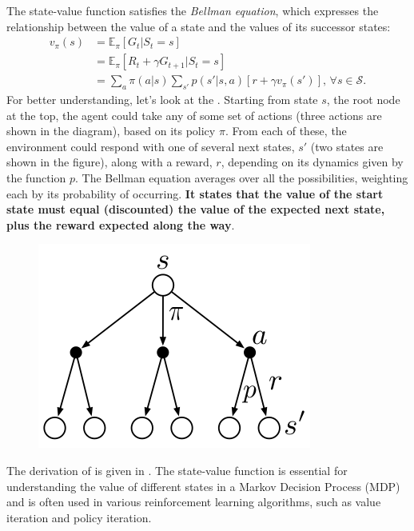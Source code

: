 The state-value function satisfies the \textit{Bellman equation}, which expresses the relationship between the value of a state and the values of its successor states:
\begin{align}
	v_\pi(s) &= \mathbb{E}_\pi[G_t|S_t=s]\\
	& = \mathbb{E}_\pi[R_{t} + \gamma G_{t+1}|S_t=s]\\
	& = \sum_{a}\pi(a|s)\sum_{s'}p(s'|s,a)[r + \gamma v_\pi(s')],\, \forall s \in \mathcal{S}.
	\label{eq:state_value_bellman}
\end{align}
For better understanding, let's look at the . Starting from state $s$, the root node at the top, the agent could take any of some set of actions (three actions are shown in the diagram), based on its policy $\pi$. From each of these, the environment could respond with one of several next states, $s'$ (two states are shown in the figure), along with a reward, $r$, depending on its dynamics given by the function $p$. The Bellman equation averages over all the possibilities, weighting each by its probability of occurring. \textbf{It states that the value of the start state must equal (discounted) the value of the expected next state, plus the reward expected along the way}. 
\begin{figure}[h]
	\centering
	\includegraphics[scale=0.3]{./images/backup_vpi.png}
	\label{fig:state_value_diagram}
\end{figure}
The derivation of  is given in . The state-value function is essential for understanding the value of different states in a Markov Decision Process (MDP) and is often used in various reinforcement learning algorithms, such as value iteration and policy iteration.

